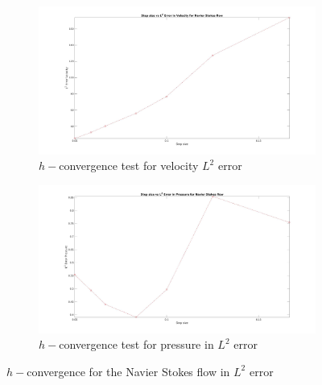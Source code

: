 \documentclass[a4paper,twoside,openright]{book}
\begin{document}
\begin{figure}
\begin{subfigure}{\textwidth}	
    \includegraphics[width=\linewidth]{L2_convergence_velocity_n_s.jpg}
    \caption{$h-$convergence test for velocity $L^2$ error}
    \label{fig:vel_navier_stoke_conv}
\end{subfigure}
\begin{subfigure}{\textwidth}	
    \includegraphics[width=\linewidth]{L2_convergence_pressure_n_s.jpg}
  \caption{$h-$convergence test for pressure in $L^2$ error}
  \label{fig:pre_navier_stoke_conv}
\end{subfigure}
\caption{$h-$convergence for the Navier Stokes flow in $L^2$ error}
\label{navier_stoke_conv_l2}
\end{figure}
\end{document}
